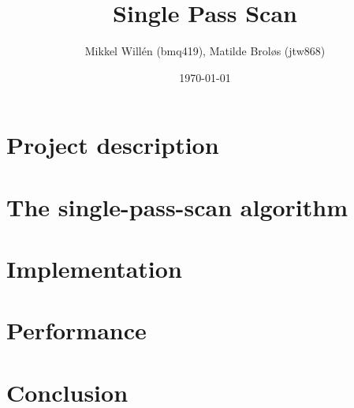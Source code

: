 \documentclass[a4paper]{article}
\title{\textbf{Single Pass Scan}}
\subtitle{}
\author{Mikkel Willén (bmq419), Matilde Broløs (jtw868)}
\date{\today}
\begin{document}
\maketitle

\tableofcontents

\newpage


\section{Project description}


\section{The single-pass-scan algorithm}\label{sec:algorithm}


\section{Implementation}\label{sec:implementation}


\section{Performance}\label{sec:performance}


\section{Conclusion}\label{sec:conclusion}


\printbibliography
\end{document}
